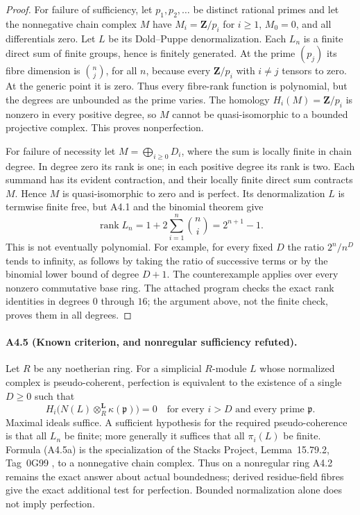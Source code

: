 \begin{proof}
For failure of sufficiency, let $p_1,p_2,\ldots$ be distinct
rational primes and let the nonnegative chain complex $M$ have
$M_i=\mathbf Z/p_i$ for $i\geq1$, $M_0=0$, and all differentials
zero.  Let $L$ be its Dold--Puppe denormalization.  Each $L_n$ is a
finite direct sum of finite groups, hence is finitely generated.
At the prime $(p_j)$ its fibre dimension is $\binom nj$, for all
$n$, because every $\mathbf Z/p_i$ with $i\ne j$ tensors to zero.
At the generic point it is zero.  Thus every fibre-rank function
is polynomial, but the degrees are unbounded as the prime varies.
The homology $H_i(M)=\mathbf Z/p_i$ is nonzero in every positive
degree, so $M$ cannot be quasi-isomorphic to a bounded projective
complex.  This proves nonperfection.

For failure of necessity let $M=\bigoplus_{i\geq0}D_i$, where the
sum is locally finite in chain degree.  In degree zero its rank
is one; in each positive degree its rank is two.  Each summand
has its evident contraction, and their locally finite direct sum
contracts $M$.  Hence $M$ is quasi-isomorphic to zero and is
perfect.  Its denormalization $L$ is termwise finite free, but
A4.1 and the binomial theorem give
\[
 \operatorname{rank}L_n
 =1+2\sum_{i=1}^{n}\binom ni
 =2^{n+1}-1.
\]
This is not eventually polynomial.  For example, for every fixed
$D$ the ratio $2^n/n^D$ tends to infinity, as follows by taking
the ratio of successive terms or by the binomial lower bound of
degree $D+1$.  The counterexample applies over every nonzero
commutative base ring.  The attached program checks the exact
rank identities in degrees $0$ through $16$; the argument above,
not the finite check, proves them in all degrees.
\end{proof}

\paragraph{A4.5 (Known criterion, and nonregular sufficiency refuted).}
\label{A4.5}
Let $R$ be any noetherian ring.  For a simplicial $R$-module $L$
whose normalized complex is pseudo-coherent, perfection is
equivalent to the existence of a single $D\geq0$ such that
\[
 H_i\bigl(N(L)\otimes_R^{\mathbf L}\kappa(\mathfrak p)\bigr)=0
       \quad\text{for every }i>D
       \text{ and every prime }\mathfrak p.
 \tag{A4.5a}
\]
Maximal ideals suffice.  A sufficient hypothesis for the required
pseudo-coherence is that all $L_n$ be finite; more generally it
suffices that all $\pi_i(L)$ be finite.  Formula (A4.5a) is the
specialization of the Stacks Project, Lemma~15.79.2,
Tag~0G99 \cite{Stacks0G99}, to a nonnegative chain complex.
Thus on a nonregular ring A4.2 remains the exact answer about
actual boundedness; derived residue-field fibres give the exact
additional test for perfection.  Bounded normalization alone
does not imply perfection.

